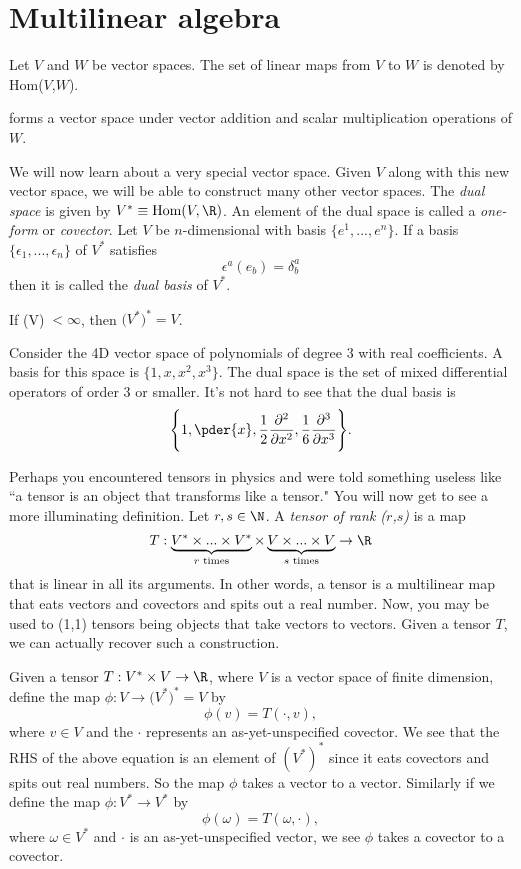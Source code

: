 \section{Multilinear algebra}
Let $V$ and $W$ be vector spaces.
The set of linear maps from $V$ to $W$ is denoted by Hom($V$,$W$).
\begin{proposition}{}{}
   forms a vector space under vector addition 
  and scalar multiplication operations of $W$. 
\end{proposition}
We will now learn about a very special vector space. Given $V$ along with
this new vector space, we will be able to construct many other vector spaces.
The {\it dual space} 
is given by $V^*\equiv\text{Hom}(V,\R)$.
An element of the dual space is called a {\it one-form} or {\it covector}.
Let $V$ be $n$-dimensional with basis $\{e^1,...,e^n\}$. If a basis
$\{\epsilon_1,...,\epsilon_n\}$ of $V^*$ satisfies
  $$\epsilon^a(e_b)=\delta^a_b$$
then it is called the {\it dual basis} of $V^*$.
\begin{theorem}{}{}
  If (V)$\;<\infty$, then $\big(V^*\big)^*=V$.
\end{theorem}
\begin{example*}{}{}
  Consider the 4D vector space of polynomials of degree 3 with
  real coefficients. A basis for this space is $\{1,x,x^2,x^3\}$. 
  The dual space is the set of mixed differential operators of order 3 or 
  smaller. It's not hard to see that the dual basis is 
  $$\Bigg\{1,\pder{x},
             \frac{1}{2}\frac{\partial^2}{\partial x^2},
             \frac{1}{6}\frac{\partial^3}{\partial x^3}\Bigg\}.$$
\end{example*}
Perhaps you encountered tensors in physics and were told something useless
like ``a tensor is an object that transforms like a tensor."
You will now get to see a more illuminating definition.
  Let $r,s\in\N$.
  A {\it tensor of rank ($r$,$s$)} is a map
  $$T:\underbrace{V^*\times...\times V^*}_\text{$r$ times}\times
      \underbrace{V\times...\times V}_\text{$s$ times}\to\R$$
  that is linear in all its arguments.
In other words, a tensor is a multilinear map that eats
vectors and covectors and spits out a real number. Now, you may be used
to (1,1) tensors being objects that take vectors to vectors. Given
a tensor $T$, we can actually recover such a construction.
\begin{example*}{}{}
  Given a tensor $T:V^*\times V\to\R$, where $V$ is a vector space
  of finite dimension, define the map $\phi:V\to \big(V^*\big)^*=V$ by
  $$\phi(v)=T(\cdot,v),$$
  where $v\in V$ and the $\cdot$ represents an as-yet-unspecified covector. 
  We see that the RHS of the above equation is an element of $(V^*)^*$ 
  since it eats covectors and spits out real numbers. So the map $\phi$ takes
  a vector to a vector. Similarly if we 
  define the map $\phi:V^*\to V^*$ by
  $$\phi(\omega)=T(\omega,\cdot),$$
  where $\omega\in V^*$ and $\cdot$ is an as-yet-unspecified vector, we see
  $\phi$ takes a covector to a covector.
\end{example*}
